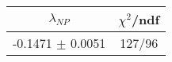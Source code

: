 \begin{tabular}{c||c}
$\lambda_{NP}$ & $\chi^{2}$/ndf  \\
\hline
-0.1471 $\pm$ 0.0051 & 127/96\\
\end{tabular}
